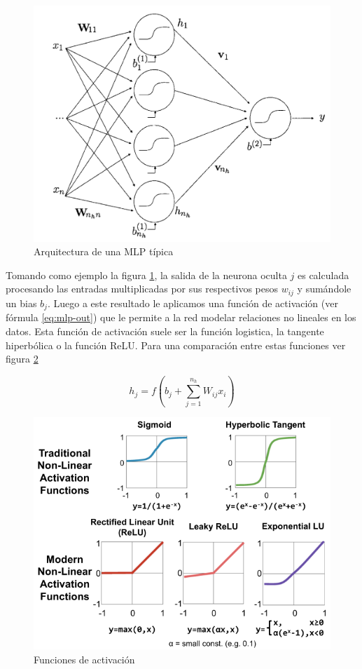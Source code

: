 \begin{figure}
    \centering
    \caption{Arquitectura de una MLP típica}
    \label{fig:mlp-eg}
    \includegraphics[width=0.6\linewidth]{graficos/mlp_eg.png}
\end{figure}

Tomando como ejemplo la figura \ref{fig:mlp-eg}, la salida de la neurona oculta $j$ es calculada procesando las entradas multiplicadas por sus respectivos pesos $w_{ij}$ y sumándole un bias $b_j$. Luego a este resultado le aplicamos una función de activación (ver fórmula \ref{eq:mlp-out}) que le permite a la red modelar relaciones no lineales en los datos. Esta función de activación suele ser la función logistica, la tangente hiperbólica o la función \ac{ReLU}. Para una comparación entre estas funciones ver figura \ref{fig:mlp-activation}

\begin{equation}
    \label{eq:mlp-out}
    h_j = f(b_j + \sum_{j=1}^{n_h} W_{ij} x_i)
\end{equation}

\begin{figure}
    \centering
    \caption{Funciones de activación}
    \label{fig:mlp-activation}
    \includegraphics[width=0.6\linewidth]{graficos/mlp_activation_functions.png}
\end{figure}

